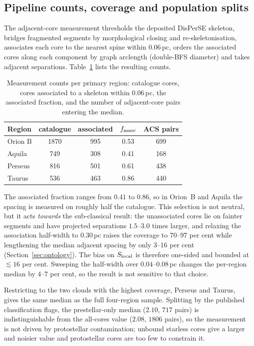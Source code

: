 \documentclass[usenatbib,twoside,twocolumn]{mnras}
\begin{document}
\subsection{Pipeline counts, coverage and population splits}
\label{sec:nnpipeline}

The adjacent-core measurement thresholds the deposited DisPerSE skeleton, bridges fragmented segments by morphological closing and re-skeletonisation, associates each core to the nearest spine within $0.06$\,pc, orders the associated cores along each component by graph arclength (double-BFS diameter) and takes adjacent separations. Table~\ref{tab:nnpipeline} lists the resulting counts.

\begin{table}
\caption{Measurement counts per primary region: catalogue cores, cores associated to a skeleton within $0.06$\,pc, the associated fraction, and the number of adjacent-core pairs entering the median.}
\label{tab:nnpipeline}
\footnotesize
\setlength{\tabcolsep}{5pt}
\begin{tabular}{lcccc}
\toprule
Region & catalogue & associated & $f_{\rm assoc}$ & ACS pairs \\
\midrule
Orion B & 1870 & 995 & 0.53 & 699 \\
Aquila  &  749 & 308 & 0.41 & 168 \\
Perseus &  816 & 501 & 0.61 & 438 \\
Taurus  &  536 & 463 & 0.86 & 440 \\
\bottomrule
\end{tabular}
\end{table}

The associated fraction ranges from $0.41$ to $0.86$, so in Orion~B and Aquila the spacing is measured on roughly half the catalogue. This selection is not neutral, but it acts \emph{towards} the sub-classical result: the unassociated cores lie on fainter segments and have projected separations $1.5$--$3.0$ times larger, and relaxing the association half-width to $0.30$\,pc raises the coverage to $70$--$97$ per cent while lengthening the median adjacent spacing by only $3$--$16$ per cent (Section~\ref{sec:ontology}). The bias on $S_{\rm local}$ is therefore one-sided and bounded at $\lesssim16$ per cent. Sweeping the half-width over $0.04$--$0.08$\,pc changes the per-region median by $4$--$7$ per cent, so the result is not sensitive to that choice.

Restricting to the two clouds with the highest coverage, Perseus and Taurus, gives the same median as the full four-region sample. Splitting by the published classification flags, the prestellar-only median ($2.10$, $717$ pairs) is indistinguishable from the all-cores value ($2.08$, $1806$ pairs), so the measurement is not driven by protostellar contamination; unbound starless cores give a larger and noisier value and protostellar cores are too few to constrain it.
\end{document}
